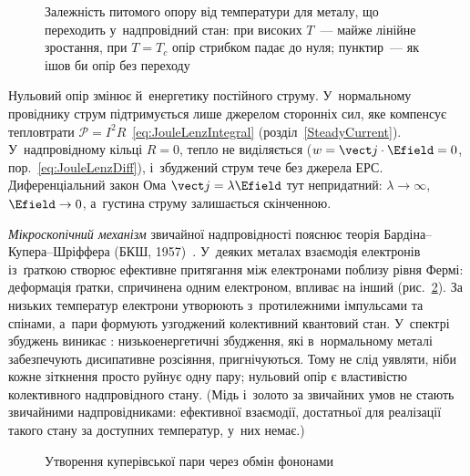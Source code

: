 \begin{figure}[h!]\centering
	\caption{Залежність питомого опору від температури для металу, що переходить
	у~надпровідний стан: при високих $T$~--- майже лінійне зростання, при $T=T_c$ опір
	стрибком падає до нуля; пунктир~--- як ішов би опір без переходу}
	\label{pic:superconductorR}
\end{figure}

Нульовий опір змінює й~енергетику постійного струму. У~нормальному провіднику струм
підтримується лише джерелом сторонніх сил, яке компенсує тепловтрати $\mathcal
P=I^2R$~\eqref{eq:JouleLenzIntegral} (розділ~\ref{SteadyCurrent}). У~надпровідному кільці
$R=0$, тепло не виділяється ($w=\vect j\cdot\Efield=0$, пор.~\eqref{eq:JouleLenzDiff}),
і~збуджений струм тече без джерела ЕРС. Диференціальний закон Ома $\vect j=\lambda\Efield$
тут непридатний: $\lambda\to\infty$, $\Efield\to0$, а~густина струму залишається
скінченною.

\emph{Мікроскопічний механізм} звичайної надпровідності пояснює теорія
Бардіна--\allowbreak Купера--\allowbreak Шріффера (БКШ, 1957)~\cite{BCS1957}. У~деяких металах взаємодія
електронів із~ґраткою створює ефективне притягання між електронами поблизу рівня Фермі:
деформація ґратки, спричинена одним електроном, впливає на інший (рис.~\ref{pic:CooperPair}).
За низьких температур електрони утворюють  з~протилежними
імпульсами та спінами, а~пари формують узгоджений колективний квантовий стан. У~спектрі
збуджень виникає : низькоенергетичні збудження,
які в~нормальному металі забезпечують дисипативне розсіяння, пригнічуються. Тому не слід
уявляти, ніби кожне зіткнення просто руйнує одну пару; нульовий опір є властивістю
колективного надпровідного стану. (Мідь і~золото за звичайних умов не стають звичайними
надпровідниками: ефективної взаємодії, достатньої для реалізації такого стану за доступних
температур, у~них немає.)


\begin{figure}\centering
	\caption{Утворення куперівської пари через обмін фононами\label{pic:CooperPair}}
\end{figure}

